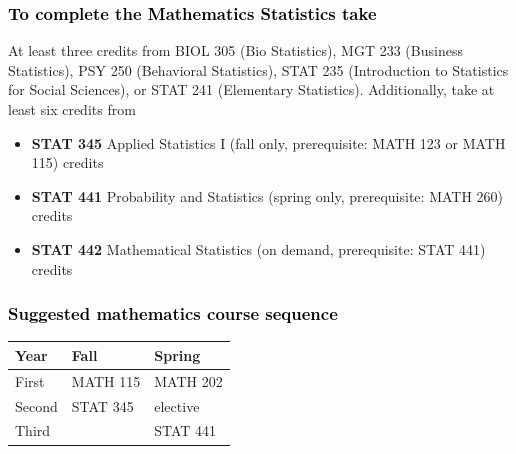 \documentclass[11pt]{article}
\newcommand{\calconeshort}{MATH 115}
\newcommand{\calctwoshort}{MATH 202}
\newcommand{\statistics}{\textbf{STAT 441} Probability and Statistics (spring only, prerequisite: MATH 260)  \dotfill  3 credits}
\newcommand{\statisticsshort}{STAT 441}
\newcommand{\statisticsII}{\textbf{STAT 442} Mathematical Statistics   (on demand, prerequisite: STAT 441)  \dotfill  3 credits}
\newcommand{\appliedstat}{\textbf{STAT 345} Applied Statistics I (fall only, prerequisite: MATH 123 or MATH 115) \dotfill 3 credits}
\newcommand{\appliedstatshort}{STAT 345}
\newcommand{\statMinor}{
     \begin{center}
         \begin{tabular}[h]{| l | l | l|} 
            \hline
            \textbf{Year}           & \textbf{Fall}         &  \textbf{Spring}  \\ \hline 
            First & \calconeshort{}  & \calctwoshort \\  \hline
            Second &  \appliedstatshort &  elective \\ \hline
            Third &           &  \statisticsshort \\ \hline
                  \end{tabular}
\end{center}}
\begin{document}
\subsubsection*{\textcolor{black}{To complete the Mathematics Statistics take}}

At least three credits from BIOL 305 (Bio Statistics), MGT 233 (Business Statistics), PSY 250 (Behavioral Statistics),
STAT 235 (Introduction to Statistics for Social Sciences), or STAT 241 (Elementary Statistics).   Additionally, take 
at least six credits from  
\begin{itemize}
\item \appliedstat
\item \statistics
\item \statisticsII
\end{itemize}
\vspace{0.1in}


\vspace{-0.1in}
\subsubsection*{\textcolor{black}{Suggested mathematics course sequence}}

\begin{center}
\statMinor
\end{center}
\end{document}
